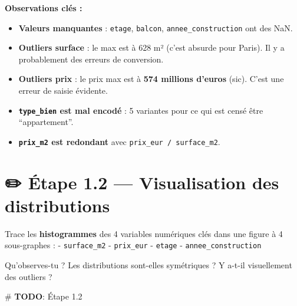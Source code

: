 \documentclass[
  french,
  11pt,
  a4paper,
]{scrbook}
\newenvironment{Shaded}{}{}
\newcommand{\AlertTok}[1]{\textcolor[rgb]{1.00,0.33,0.33}{\textbf{#1}}}
\newcommand{\CommentTok}[1]{\textcolor[rgb]{0.42,0.45,0.49}{#1}}
\providecommand{\tightlist}{%
  \setlength{\itemsep}{0pt}\setlength{\parskip}{0pt}}
\begin{document}
\begin{tcolorbox}
\textbf{Observations clés :}

\begin{itemize}
\tightlist
\item
  \textbf{Valeurs manquantes} : \texttt{etage}, \texttt{balcon},
  \texttt{annee\_construction} ont des NaN.
\item
  \textbf{Outliers surface} : le max est à 628 m² (c'est absurde pour
  Paris). Il y a probablement des erreurs de conversion.
\item
  \textbf{Outliers prix} : le prix max est à \textbf{574 millions
  d'euros} (sic). C'est une erreur de saisie évidente.
\item
  \textbf{\texttt{type\_bien} est mal encodé} : 5 variantes pour ce qui
  est censé être ``appartement''.
\item
  \textbf{\texttt{prix\_m2} est redondant} avec
  \texttt{prix\_eur\ /\ surface\_m2}.
\end{itemize}

\end{tcolorbox}

\section{✏️ Étape 1.2 --- Visualisation des
distributions}\label{uxe9tape-1.2-visualisation-des-distributions}

\begin{tcolorbox}[enhanced jigsaw, arc=.35mm, bottomrule=.15mm, bottomtitle=1mm, breakable, colback=white, colbacktitle=quarto-callout-note-color!10!white, colframe=quarto-callout-note-color-frame, coltitle=black, left=2mm, leftrule=.75mm, opacityback=0, opacitybacktitle=0.6, rightrule=.15mm, title={📝 À faire}, titlerule=0mm, toprule=.15mm, toptitle=1mm]

Trace les \textbf{histogrammes} des 4 variables numériques clés dans une
figure à 4 sous-graphes : - \texttt{surface\_m2} - \texttt{prix\_eur} -
\texttt{etage} - \texttt{annee\_construction}

Qu'observes-tu ? Les distributions sont-elles symétriques ? Y a-t-il
visuellement des outliers ?

\end{tcolorbox}

\begin{Shaded}
\begin{Highlighting}[]
\CommentTok{\# }\AlertTok{TODO}\CommentTok{: Étape 1.2}
\end{Highlighting}
\end{Shaded}
\end{document}

